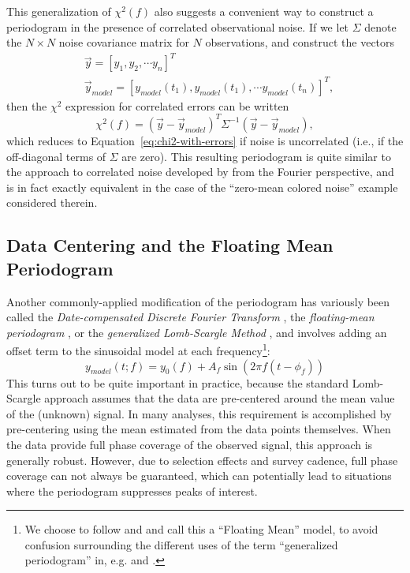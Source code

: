 \documentclass[preprint]{aastex}
\newcommand{\Eq}[1]{Equation~\ref{eq:#1}}
\newcommand{\eq}[1]{\Eq{#1}}
\newcommand{\eqlabel}[1]{\label{eq:#1}}
\newcommand{\sectlabel}[1]{\label{sect:#1}}
\begin{document}
This generalization of $\chi^2(f)$ also suggests a convenient way to
construct a periodogram in the presence of correlated observational noise.
If we let $\Sigma$ denote the  $N\times N$ noise
covariance matrix for $N$ observations, and construct the
vectors
\begin{eqnarray}
  &\vec{y} = [y_1, y_2,\cdots y_n]^T \nonumber\\
  &\vec{y}_{model} = [y_{model}(t_1),y_{model}(t_1),\cdots y_{model}(t_n)]^T,
\end{eqnarray}
then the $\chi^2$ expression for correlated errors can be written
\begin{equation}
  \chi^2(f) = (\vec{y}-\vec{y}_{model})^T\Sigma^{-1}(\vec{y}-\vec{y}_{model}),
  \eqlabel{chi2-with-correlated-errors}
\end{equation}
which reduces to \eq{chi2-with-errors} if noise is uncorrelated (i.e., if the
off-diagonal terms of $\Sigma$ are zero).
This resulting periodogram is quite similar to the approach to correlated
noise developed by \citet{Vio2010} from the Fourier perspective,
and is in fact exactly equivalent in the case of the
``zero-mean colored noise'' example considered therein.

\subsection{Data Centering and the Floating Mean Periodogram}
\sectlabel{floating-mean}

Another commonly-applied modification of the periodogram has variously been
called the
{\it Date-compensated Discrete Fourier Transform} \citep{Ferraz-Mello81},
the {\it floating-mean periodogram} \citep{Cumming99,VanderPlas2015},
or the {\it generalized Lomb-Scargle Method} \citep{Zechmeister09},
and involves adding an offset term to the sinusoidal model at each
frequency\footnote{We choose to follow \citet{Cumming99} and
  \citet{VanderPlas2015} and call this a ``Floating Mean'' model, to
  avoid confusion surrounding the different uses of the term
  ``generalized periodogram'' in, {e.g.} \citet{Bretthorst88} and
  \citet{Zechmeister09}.
}:
\begin{equation}
  y_{model}(t;f) = y_0(f) + A_f \sin(2 \pi f (t - \phi_f))
  \eqlabel{floating-mean-model}
\end{equation}
This turns out to be quite important in practice, because the standard
Lomb-Scargle approach assumes that the
data are pre-centered around the mean value of the (unknown) signal.
In many analyses, this requirement is accomplished by pre-centering using
the mean estimated from the data points themselves.
When the data provide full phase coverage of the observed signal,
this approach is generally robust.
However, due to selection effects and survey cadence, full phase
coverage can not always be guaranteed, which can potentially lead to situations
where the periodogram suppresses peaks of interest.
\end{document}
